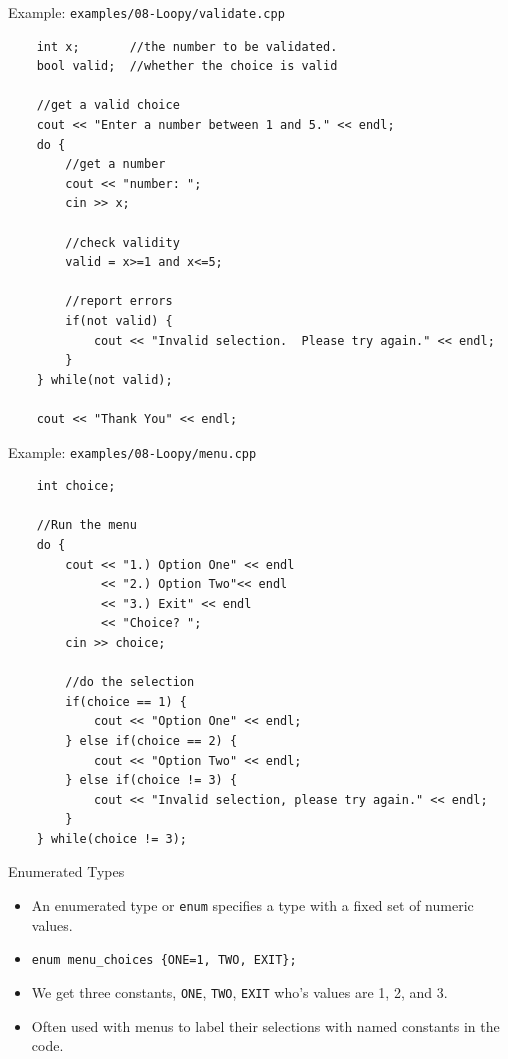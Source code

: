 \documentclass[]{beamer}
\begin{document}
\begin{frame}[fragile]{Example: \texttt{examples/08-Loopy/validate.cpp}}
    \begin{adjustbox}{max totalheight=0.8\textheight, max width=0.9\textwidth}
        \begin{BVerbatim}
    int x;       //the number to be validated.
    bool valid;  //whether the choice is valid

    //get a valid choice
    cout << "Enter a number between 1 and 5." << endl;
    do {
        //get a number
        cout << "number: ";
        cin >> x;

        //check validity
        valid = x>=1 and x<=5;

        //report errors
        if(not valid) {
            cout << "Invalid selection.  Please try again." << endl;
        }
    } while(not valid);

    cout << "Thank You" << endl;
        \end{BVerbatim}
    \end{adjustbox}
\end{frame}

\begin{frame}[fragile]{Example: \texttt{examples/08-Loopy/menu.cpp}}
    \begin{adjustbox}{max totalheight=0.8\textheight, max width=0.9\textwidth}
        \begin{BVerbatim}
    int choice;

    //Run the menu
    do {
        cout << "1.) Option One" << endl
             << "2.) Option Two"<< endl
             << "3.) Exit" << endl
             << "Choice? ";
        cin >> choice;

        //do the selection
        if(choice == 1) {
            cout << "Option One" << endl;
        } else if(choice == 2) {
            cout << "Option Two" << endl;
        } else if(choice != 3) {
            cout << "Invalid selection, please try again." << endl;
        }
    } while(choice != 3);
        \end{BVerbatim}
    \end{adjustbox}
\end{frame}


\begin{frame}[fragile]{Enumerated Types}
    \begin{itemize}[<+->]
        \item An enumerated type or \texttt{enum} specifies a type
            with a fixed set of numeric values.
        \item \verb!enum menu_choices {ONE=1, TWO, EXIT};!
        \item We get three constants, \texttt{ONE}, \texttt{TWO},
            \texttt{EXIT} who's values are 1, 2, and 3.
        \item Often used with menus to label their selections with
            named constants in the code.
    \end{itemize}
\end{frame}
\end{document}
